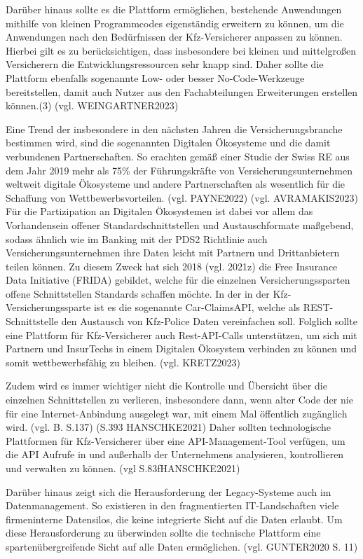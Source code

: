 Darüber hinaus sollte es die Plattform ermöglichen, bestehende Anwendungen mithilfe von kleinen Programmcodes eigenständig erweitern zu können, um die Anwendungen nach den Bedürfnissen der Kfz-Versicherer anpassen zu können. Hierbei gilt es zu berücksichtigen, dass insbesondere bei kleinen und mittelgroßen Versicherern die Entwicklungsressourcen sehr knapp sind. Daher sollte die Plattform ebenfalls sogenannte Low- oder besser No-Code-Werkzeuge bereitstellen, damit auch Nutzer aus den Fachabteilungen Erweiterungen erstellen können.(3) (vgl. WEINGARTNER2023)

Eine Trend der insbesondere in den nächsten Jahren die Versicherungsbranche bestimmen wird, sind die sogenannten Digitalen Ökosysteme und die damit verbundenen Partnerschaften. So erachten gemäß einer Studie der Swiss RE aus dem Jahr 2019 mehr als 75\% der Führungskräfte von Versicherungsunternehmen weltweit digitale Ökosysteme und andere Partnerschaften als wesentlich für die Schaffung von Wettbewerbsvorteilen. (vgl. PAYNE2022) (vgl. AVRAMAKIS2023) Für die Partizipation an Digitalen Ökosystemen ist dabei vor allem das Vorhandensein offener Standardschnittstellen und Austauschformate maßgebend, sodass ähnlich wie im Banking mit der PDS2 Richtlinie auch Versicherungsunternehmen ihre Daten leicht mit Partnern und Drittanbietern  teilen können. Zu diesem Zweck hat sich 2018 (vgl. 2021z) die Free Insurance Data Initiative (FRIDA)  gebildet, welche für die einzelnen Versicherungssparten offene Schnittstellen Standards schaffen möchte. In der in der Kfz-Versicherungssparte ist es die sogenannte Car-ClaimsAPI, welche als REST-Schnittstelle den Austausch von Kfz-Police Daten vereinfachen soll. Folglich sollte eine Plattform für Kfz-Versicherer auch Rest-API-Calls unterstützen, um sich mit Partnern und InsurTechs in einem Digitalen Ökosystem verbinden zu können und somit wettbewerbsfähig zu bleiben. (vgl. KRETZ2023) 

Zudem wird es immer wichtiger nicht die Kontrolle und Übersicht über die einzelnen Schnittstellen zu verlieren, insbesondere dann, wenn alter Code der nie für eine Internet-Anbindung ausgelegt war, mit einem Mal öffentlich zugänglich wird. (vgl. B. S.137) (S.393 HANSCHKE2021) Daher sollten technologische Plattformen für Kfz-Versicherer über eine API-Management-Tool verfügen, um die API Aufrufe in und außerhalb der Unternehmens analysieren, kontrollieren und verwalten zu können. (vgl S.83fHANSCHKE2021)

Darüber hinaus zeigt sich die Herausforderung der Legacy-Systeme auch im Datenmanagement. So existieren in den fragmentierten IT-Landschaften viele firmeninterne Datensilos, die keine integrierte Sicht auf die Daten erlaubt. Um diese Herausforderung zu überwinden sollte die technische Plattform eine spartenübergreifende Sicht auf alle Daten ermöglichen. (vgl. GUNTER2020 S. 11)

